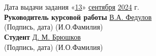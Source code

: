 \documentclass[14pt, a4paper]{extarticle} %
\newcommand{\und}[1]{\uline{#1}}
\begin{document}
\begin{titlepage}
\begin{flushleft}
        \underline{\hspace{15cm}} \\
        \underline{\hspace{15cm}} \\[1.5cm]
        Дата выдачи задания «\und{13}» \und{сентября} \und{2024} г. \\[2cm]
        \textbf{Руководитель курсовой работы} \hfill \underline{\hspace{5cm}} \hfill \und{В.А. Федулов} \\
        \hspace{8cm} (Подпись, дата) \hspace{2cm} (И.О.Фамилия) \\[1.5cm]
        \textbf{Студент} \hfill \underline{\hspace{5cm}} \hfill \und{Д. М. Брюшков} \\
        \hspace{8cm} (Подпись, дата) \hspace{2cm} (И.О.Фамилия)
    \end{flushleft}

\end{titlepage}
\end{document}
